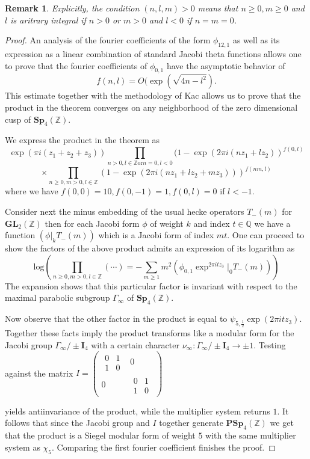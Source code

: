 \documentclass[9pt]{amsart} \usepackage[utf8]{inputenc}
\newtheorem{remark}{Remark}
\newcommand{\Q}{\mathbb{Q}}
\newcommand{\Z}{\mathbb{Z}} \newcommand{\C}{\mathbb{C}}
\newcommand{\Sp}{\mathbf{Sp}}
\newcommand{\PSp}{\mathbf{PSp}}
\newcommand{\GL}{\mathbf{GL}}
\newcommand{\Id}{\mathbf{I}}
\begin{document}
\begin{remark}
Explicitly, the condition $(n,l,m) > 0$ means that $n\geq 0,m\geq 0$ and
$l$ is aritrary integral if $n>0$ or $m > 0$ and $l<0$ if $n = m = 0$.
\end{remark}

\begin{proof}
An analysis of the fourier coefficients of the form $\phi_{12,1}$ as
well as its expression as a linear combination of standard Jacobi theta
functions allows one to prove that the fourier coefficients of
$\phi_{0,1}$ have the asymptotic behavior of $$f(n,l) =O(\exp(\sqrt{4n
-l^2}).$$ This estimate together with the methodology of Kac\cite{KAC:1}
allows us to prove that the product in the theorem converges on any
neighborhood of the zero dimensional cusp of $\Sp_4(\Z)$.

We express the product in the theorem as $$\exp(\pi i(z_1 + z_2 + z_3))
\displaystyle\prod_{n>0,l\in\Z \textrm{or} n=0, l<0}(1 -\exp(2\pi i(nz_1 +
lz_2))^{f(0,l)}$$ $$ \times \displaystyle\prod_{n\geq0,m>0,l\in\Z}(1 - \exp(2\pi i(n z_1 + l
z_2 + m z_3)))^{f(nm,l)}$$ where we have $f(0,0) = 10, f(0,-1) =1,
f(0,l) = 0$ if $l < -1$.


Consider next the minus embedding of the usual hecke operators
$T_{-}(m)$ for $\GL_2(\Z)$ then for each Jacobi form $\phi$ of weight
$k$ and index $t \in \Q$ we have a function $(\phi |_k T_{-}(m))$ which
is a Jacobi form of index $mt$. One can proceed to show the factors of
the above product admits an expression of its logarithm as
$$\textrm{log}(\displaystyle\prod_{n\geq 0,m>0,l\in\Z} (\cdots) = - \sum_{m\geq 1} m^2
(\phi_{0,1}\exp^{2\pi i t z_3}|_0 T_{-}(m)))$$ The expansion shows that
this particular factor is invariant with respect to the maximal
parabolic subgroup $\Gamma_{\infty}$ of $\Sp_4(\Z)$.

  Now observe that the other factor in the product is equal to
  $\psi_{5,\frac{1}{2}}\exp(2\pi i t z_3)$. Together these facts imply
  the product transforms like a modular form for the Jacobi group
  $\Gamma_{\infty} / \pm\Id_4$ with a certain character $\nu_{\infty} :
  \Gamma_{\infty} / \pm\Id_4 \rightarrow \pm 1$. Testing against the
  matrix $I = \begin{pmatrix}\begin{matrix}0 & 1\\ 1 & 0\end{matrix} & 0\\ 0 &
  \begin{matrix}0 & 1\\1 & 0\end{matrix}\end{pmatrix}$

  yields antiinvariance  of the product, while the multiplier system
  returns $1$. It follows that since the Jacobi group and $I$ together
  generate $\PSp_4(\Z)$ we get that the product is a Siegel modular form
  of weight $5$ with the same multiplier system as $\chi_5$. Comparing
  the first fourier coefficient finishes the proof.


\end{proof}




\end{document}
